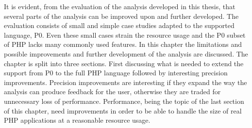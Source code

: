 It is evident, from the evaluation of the analysis developed in this thesis, that several parts of the analysis can be improved upon and further developed. The evaluation consists of small and simple case studies adapted to the supported language, P0. Even these small cases strain the resource usage and the P0 subset of PHP lacks many commonly used features. In this chapter the limitations and possible improvements and further development of the analysis are discussed. The chapter is split into three sections. First discussing what is needed to extend the support from P0 to the full PHP language followed by interesting precision improvements. Precision improvements are interesting if they expand the way the analysis can produce feedback for the user, otherwise they are traded for unnecessary loss of performance. Performance, being the topic of the last section of this chapter, need improvements in order to be able to handle the size of real PHP applications at a reasonable resource usage.